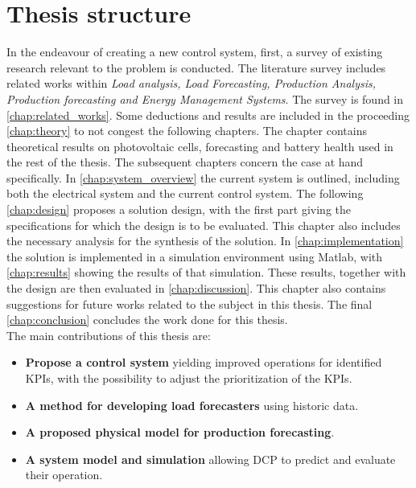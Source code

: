\section{Thesis structure}
 In the endeavour of creating a new control system, first, a survey of existing research relevant to the problem is conducted. The literature survey includes related works within \textit{Load analysis, Load Forecasting, Production Analysis, Production forecasting and Energy Management Systems}. The survey is found in \autoref{chap:related_works}. Some deductions and results are included in the proceeding \autoref{chap:theory} to not congest the following chapters. The chapter contains theoretical results on photovoltaic cells, forecasting and battery health used in the rest of the thesis. The subsequent chapters concern the case at hand specifically. In \autoref{chap:system_overview} the current system is outlined, including both the electrical system and the current control system. The following \autoref{chap:design} proposes a solution design, with the first part giving the specifications for which the design is to be evaluated. This chapter also includes the necessary analysis for the synthesis of the solution. In \autoref{chap:implementation} the solution is implemented in a simulation environment using Matlab, with \autoref{chap:results} showing the results of that simulation. These results, together with the design are then evaluated in \autoref{chap:discussion}. This chapter also contains suggestions for future works related to the subject in this thesis. The final \autoref{chap:conclusion} concludes the work done for this thesis.\\

 The main contributions of this thesis are:
\begin{itemize}
    \item \textbf{Propose a control system} yielding improved operations for identified KPIs, with the possibility to adjust the prioritization of the KPIs. 
    \item \textbf{A method for developing load forecasters} using historic data.
    \item \textbf{A proposed physical model for production forecasting}.
    \item \textbf{A system model and simulation} allowing DCP to predict and evaluate their operation.
\end{itemize}
